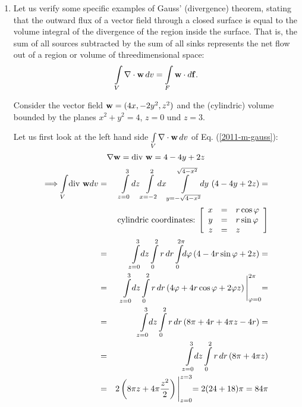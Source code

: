 {\begin{enumerate}
\item
Let us verify  some specific examples of Gauss' (divergence) theorem,
stating that the outward flux of a vector field through a closed surface
is equal to the volume integral of the divergence of the region inside the surface.
That is, the sum of all sources subtracted by the sum of all sinks represents the net flow out of a region or volume of threedimensional space:
\begin{equation}
\int \limits_V \nabla \cdot {\bf w} \, dv   =\int \limits_F {\bf w} \cdot d{\bf f}
.   \label{2011-m-gauss}
\end{equation}

Consider the vector field ${\bf w} = (4x, -2y^2, z^2)$
and the (cylindric) volume bounded by the planes
$x^2 + y^2 = 4$, $z=0$ und $z=3$.


Let us first look at the left hand side $\int \limits_V \nabla \cdot {\bf w} \, dv $
of Eq. (\ref{2011-m-gauss}):
$$
  \nabla {\bf w}=\textrm{div } {\bf w}=4-4y+2z
$$
\begin{eqnarray*}
  \Longrightarrow \int \limits_V \! \textrm{div } {\bf w} dv& = &
  \int \limits_{z=0}^3 \! dz \int \limits_{x=-2}^2 \!\! dx
  \int \limits_{y=-\sqrt{4-x^2}}^{\sqrt{4-x^2}} \!\!\!dy\,
    \left(4-4y+2z\right)= \\
  & & \mbox{cylindric coordinates: }
  \Biggl[
    \begin{array}{rcl}
      x & = & r \cos \varphi \\
      y & = & r \sin \varphi \\
      z & = & z
    \end{array}
  \Biggr] \\
  & = & \int \limits_{z=0}^3 \!\! dz \int \limits_0^2 r\, dr
  \int \limits_0^{2\pi} \!\! d\varphi \left(4-4r \sin \varphi+2z\right)= \\
  & = & \int \limits_{z=0}^3 \!\! dz \int \limits_0^2 r \, dr
  \left(4 \varphi +4r\cos\varphi+2\varphi z\right)
  \Biggl|_{\varphi=0}^{2 \pi}= \\
  & = & \int \limits_{z=0}^3 \!\! dz \int \limits_0^2 r\, dr
  \left(8 \pi +4r+4 \pi z -4r\right)= \\
  & = & \int \limits_{z=0}^3 \!\! dz \int \limits_0^2 r\, dr
  \left(8 \pi +4 \pi z\right) \\
  & = & 2 \left( 8 \pi z +4 \pi \frac{z^2}{2}\right)\Biggl|_{z=0}^{z=3}=
    2 (24+18) \pi = 84 \pi
\end{eqnarray*}


\end{enumerate}}
